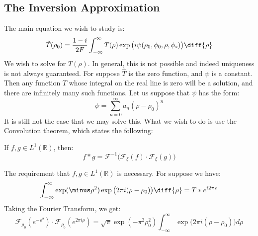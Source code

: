         \subsection{The Inversion Approximation}
            The main equation we wish to study is:
            \begin{equation}
            \hat{T}(\rho_0)=
            \frac{1-i}{2F}\int_{-\infty}^{\infty}T(\rho)
            \exp\big(i\psi(\rho_{0},\phi_{0},\rho,\phi_{s})\big)
                \diff{\rho}
            \end{equation}
            We wish to solve for $T(\rho)$. In general, this is not
            possible and indeed uniqueness is not always guaranteed.
            For suppose $\hat{T}$ is the zero function, and
            $\psi$ is a constant. Then any function $T$ whose
            integral on the real line is zero will be a solution,
            and there are infinitely many such functions.
            Let us suppose that $\psi$ has the form:
            \begin{equation}
                \psi=\sum_{n=0}^{\infty}a_{n}(\rho-\rho_{0})^{n}
            \end{equation}
            It is still not the case that we may solve this. What
            we wish to do is use the Convolution theorem, which
            states the following:
            \begin{theorem}
                If $f,g\in L^{1}(\mathbb{R})$, then:
                \begin{equation}
                    f*g=\mathcal{F}^{-1}\big(
                        \mathcal{F}_{\xi}(f)\cdot
                        \mathcal{F}_{\xi}(g)
                    \big)
                \end{equation}
            \end{theorem}
            The requirement that $f,g\in L^{1}(\mathbb{R})$ is
            necessary. For suppose we have:
            \begin{equation}
                \int_{-\infty}^{\infty}
                    \exp(\minus\rho^{2})
                    \exp\big(2\pi{i}(\rho-\rho_{0})\big)\diff{\rho}
                    =T*e^{i2\pi\rho}    
            \end{equation}
            Taking the Fourier Transform, we get:
            \begin{equation}
                \mathcal{F}_{\rho_0}(e^{\minus\rho^{2}})\cdot
                \mathcal{F}_{\rho_0}(e^{2\pi i \rho})
                =\sqrt{\pi}\exp(\minus\pi^{2}\rho_0^{2})
                    \int_{-\infty}^{\infty}
                    \exp\big(2\pi{i}(\rho-\rho_{0})\big)d\rho
            \end{equation}

